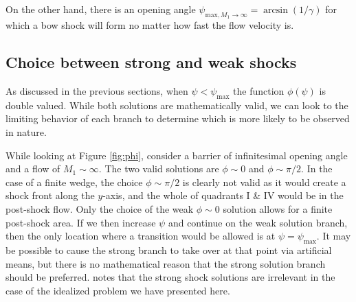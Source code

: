 \documentclass[twocolumn]{aastex631}
\begin{document}
On the other hand, there is an opening angle $\psi_{\text{max},M_1\rightarrow \infty} = \arcsin{(1/\gamma)}$ for which a bow shock will form no matter how fast the flow velocity is.

\subsection{Choice between strong and weak shocks}
As discussed in the previous sections, when $\psi<\psi_\text{max}$ the function $\phi(\psi)$ is double valued. While both solutions are mathematically valid, we can look to the limiting behavior of each branch to determine which is more likely to be observed in nature.

While looking at Figure \ref{fig:phi}, consider a barrier of infinitesimal opening angle and a flow of $M_1\sim\infty$. The two valid solutions are $\phi\sim 0$ and $\phi\sim\pi/2$. In the case of a finite wedge, the choice $\phi\sim\pi/2$ is clearly not valid as it would create a shock front along the $y$-axis, and the whole of quadrants I \& IV would be in the post-shock flow. Only the choice of the weak $\phi\sim 0$ solution allows for a finite post-shock area. If we then increase $\psi$ and continue on the weak solution branch, then the only location where a transition would be allowed is at $\psi=\psi_\text{max}$. It may be possible to cause the strong branch to take over at that point via artificial means, but there is no mathematical reason that the strong solution branch should be preferred. \citet{shu} notes that the strong shock solutions are irrelevant in the case of the idealized problem we have presented here. 



\end{document}
